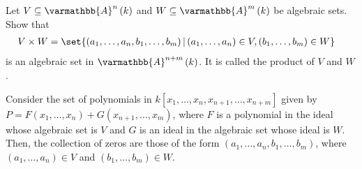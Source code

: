 \documentclass[10pt]{mypackage}
\renewcommand*{\mathbb}[1]{\varmathbb{#1}}
\newcommand{\A}{\mathbb{A}}
\begin{document}
\begin{exercise}[Exercise 1.15]
Let $V\subseteq \A^n\left(k\right)$ and $W\subseteq \A^m\left(k\right)$ be algebraic sets. Show that
\begin{align*}
  V\times W &= \set{\left(a_1,\dots,a_n,b_1,\dots,b_m\right) | \left(a_1,\dots,a_n\right)\in V,\left(b_1,\dots,b_m\right)\in W}
\end{align*}
is an algebraic set in $\A^{n+m}\left(k\right)$. It is called the product of $V$ and $W$.
\end{exercise}
\begin{solution}
  Consider the set of polynomials in $k\left[x_1,\dots,x_n,x_{n+1},\dots,x_{n+m}\right]$ given by $P = F\left(x_1,\dots,x_n\right) + G\left(x_{n+1},\dots,x_m\right)$, where $F$ is a polynomial in the ideal whose algebraic set is $V$ and $G$ is an ideal in the algebraic set whose ideal is $W$. Then, the collection of zeros are those of the form $\left(a_1,\dots,a_n,b_1,\dots,b_m\right)$, where $\left(a_1,\dots,a_n\right)\in V$ and $\left(b_1,\dots,b_m\right)\in W$.
\end{solution}
\end{document}
